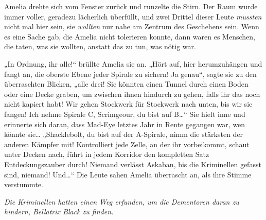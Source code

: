 Amelia drehte sich vom Fenster zurück und runzelte die Stirn. Der Raum wurde immer voller, geradezu lächerlich überfüllt, und zwei Drittel dieser Leute \emph{mussten} nicht mal hier sein, sie \emph{wollten} nur nahe am Zentrum des Geschehens sein. Wenn es eine Sache gab, die Amelia nicht tolerieren konnte, dann waren es Menschen, die taten, was sie wollten, anstatt das zu tun, was nötig war.

„In Ordnung, ihr alle!“ brüllte Amelia sie an. „Hört auf, hier herumzuhängen und fangt an, die oberste Ebene jeder Spirale zu sichern! Ja genau“, sagte sie zu den überraschten Blicken, „alle drei! Sie könnten einen Tunnel durch einen Boden oder eine Decke graben, um zwischen ihnen hindurch zu gehen, falls ihr das noch nicht kapiert habt! Wir gehen Stockwerk für Stockwerk nach unten, bis wir sie fangen! Ich nehme Spirale C, Scrimgeour, du bist auf B…“ Sie hielt inne und erinnerte sich daran, dass Mad-Eye letztes Jahr in Rente gegangen war, wen könnte sie… „Shacklebolt, du bist auf der A-Spirale, nimm die stärksten der anderen Kämpfer mit! Kontrolliert jede Zelle, an der ihr vorbeikommt, schaut unter Decken nach, führt in jedem Korridor den kompletten Satz Entdeckungszauber durch! Niemand verlässt Askaban, bis die Kriminellen gefasst sind, niemand! Und…“ Die Leute sahen Amelia überrascht an, als ihre Stimme verstummte.

\emph{Die Kriminellen hatten einen Weg erfunden, um die Dementoren daran zu hindern, Bellatrix Black zu finden.}

